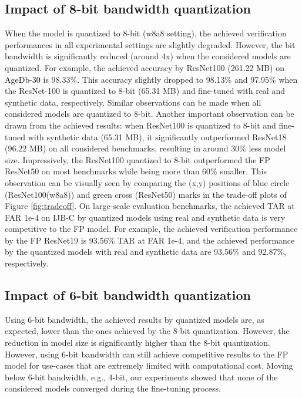 \documentclass[a4paper,conference]{IEEEtran}
\begin{document}
\subsection{Impact of 8-bit bandwidth quantization}
\vspace{-1mm}
When the model is quantized to 8-bit (w8a8 setting), the achieved verification performances in all experimental settings are slightly degraded. However, the bit bandwidth is significantly reduced (around 4x) when the considered models are quantized. For example, the achieved accuracy by ResNet100 (261.22 MB) on \textcolor{black}{AgeDb-30} is 98.33\%.
This accuracy slightly dropped to 98.13\% and 97.95\% when the ResNet-100 is quantized to 8-bit (65.31 MB) and fine-tuned with real and synthetic data, respectively. Similar observations can be made when all considered models are quantized to 8-bit. Another important observation can be drawn from the achieved results: when ResNet100 is quantized to 8-bit and fine-tuned with synthetic data (65.31 MB), it significantly outperformed ResNet18 (96.22 MB) on all considered benchmarks, resulting in around 30\% less model size. Impressively, the ResNet100 quantized to 8-bit outperformed the FP ResNet50 on most benchmarks while being more than 60\% smaller. 
This observation can be visually seen
by comparing the (x,y) positions of blue circle (ResNet100(w8a8)) and green cross (ResNet50) marks in
the trade-off plots of Figure \ref{fig:tradeoff}.
On large-scale evaluation \textcolor{black}{benchmarks}, the achieved TAR at FAR 1e-4 on IJB-C by quantized models using real and synthetic data is very competitive to the FP model. For example, the achieved verification performance by the FP ResNet19 is 93.56\% TAR at FAR 1e-4, and the achieved performance by the quantized models with real and synthetic data are 93.56\% and 92.87\%, respectively. 

\subsection{Impact of 6-bit bandwidth quantization}
Using 6-bit bandwidth, the achieved results by quantized models are, as expected, lower than the ones achieved by the 8-bit quantization. However, the reduction in model size is significantly higher than the 8-bit quantization. However, using 6-bit bandwidth can still achieve competitive results to the FP model for use-cases that are extremely limited with computational cost. 
Moving below 6-bit bandwidth, e.g., 4-bit, our experiments showed that none of the considered models converged during the fine-tuning process. 
\end{document}
